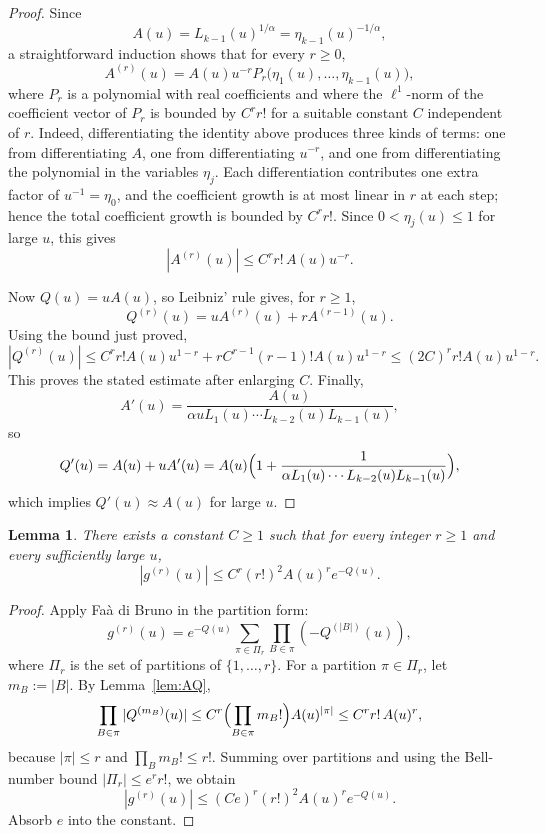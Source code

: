 \documentclass[11pt]{amsart}
\newtheorem{lemma}[theorem]{Lemma}
\renewcommand{\Pi}{\varPi}
\newcommand{\1}{{\rm 1\hspace*{-0.4ex}%
			\rule{0.1ex}{1.52ex}\hspace*{0.2ex}}}
\numberwithin{equation}{section}
\begin{document}
\begin{proof}
	Since
	\[
	A(u)=L_{k-1}(u)^{1/\alpha}=\eta_{k-1}(u)^{-1/\alpha},
	\]
	a straightforward induction shows that for every $r\ge 0$,
	\[
	A^{(r)}(u)=A(u)u^{-r}P_r\bigl(\eta_1(u),\dots,\eta_{k-1}(u)\bigr),
	\]
	where $P_r$ is a polynomial with real coefficients and where the $\ell^1$-norm of the coefficient vector of $P_r$ is bounded by $C^rr!$ for a suitable constant $C$ independent of $r$.
	Indeed, differentiating the identity above produces three kinds of terms: one from differentiating $A$, one from differentiating $u^{-r}$, and one from differentiating the polynomial in the variables $\eta_j$.
	Each differentiation contributes one extra factor of $u^{-1}=\eta_0$, and the coefficient growth is at most linear in $r$ at each step; hence the total coefficient growth is bounded by $C^rr!$.
	Since $0<\eta_j(u)\le 1$ for large $u$, this gives
	\[
	|A^{(r)}(u)|\le C^rr!\,A(u)u^{-r}.
	\]
	
	Now $Q(u)=uA(u)$, so Leibniz' rule gives, for $r\ge 1$,
	\[
	Q^{(r)}(u)=uA^{(r)}(u)+rA^{(r-1)}(u).
	\]
	Using the bound just proved,
	\[
	|Q^{(r)}(u)|
	\le C^rr!A(u)u^{1-r}+rC^{r-1}(r-1)!A(u)u^{1-r}
	\le (2C)^rr!A(u)u^{1-r}.
	\]
	This proves the stated estimate after enlarging $C$.
	Finally,
	\[
	A'(u)=\frac{A(u)}{\alpha uL_1(u)\cdots L_{k-2}(u)L_{k-1}(u)},
	\]
	so
	\[
	Q'(u)=A(u)+uA'(u)
	=A(u)\Bigl(1+\frac{1}{\alpha L_1(u)\cdots L_{k-2}(u)L_{k-1}(u)}\Bigr),
	\]
	which implies $Q'(u)\approx A(u)$ for large $u$.
\end{proof}

\begin{lemma}
	\label{lem:g}
	There exists a constant $C\ge 1$ such that for every integer $r\ge 1$ and every sufficiently large $u$,
	\[
	|g^{(r)}(u)|\le C^r (r!)^2 A(u)^r e^{-Q(u)}.
	\]
\end{lemma}

\begin{proof}
	Apply Fa\`a di Bruno in the partition form:
	\[
	g^{(r)}(u)=e^{-Q(u)}\sum_{\pi\in\Pi_r}\prod_{B\in\pi}(-Q^{(|B|)}(u)),
	\]
	where $\Pi_r$ is the set of partitions of $\{1,\dots,r\}$.
	For a partition $\pi\in\Pi_r$, let $m_B:=|B|$.
	By Lemma~\ref{lem:AQ},
	\[
	\prod_{B\in\pi}|Q^{(m_B)}(u)|
	\le C^r\Bigl(\prod_{B\in\pi}m_B!\Bigr)A(u)^{|\pi|}
	\le C^r r!\,A(u)^r,
	\]
	because $|\pi|\le r$ and $\prod_B m_B!\le r!$.
	Summing over partitions and using the Bell-number bound $|\Pi_r|\le e^r r!$, we obtain
	\[
	|g^{(r)}(u)|\le (Ce)^r(r!)^2A(u)^re^{-Q(u)}.
	\]
	Absorb $e$ into the constant.
\end{proof}
\end{document}
